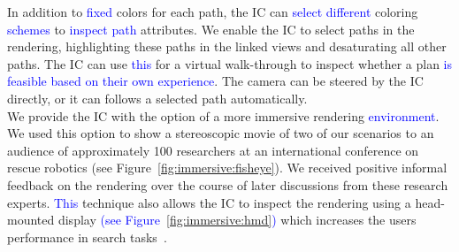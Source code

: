 \documentclass{egpubl}
\newcommand{\diff}[1]{\textcolor{blue}{#1}}
\begin{document}
%
 In addition to \diff{fixed} colors for each path, the IC can \diff{select different} coloring \diff{schemes} to \diff{inspect path} attributes. We enable the IC to select paths in the rendering, highlighting these paths in the linked views and desaturating all other paths. The IC can use \diff{this} for a virtual walk-through to inspect whether a plan \diff{is feasible based on their own experience}. The camera can be steered by the IC directly, or it can follows a selected path automatically.\\
%
 We provide the IC with the option of a more immersive rendering \diff{environment}. We used this option to show a stereoscopic movie of two of our scenarios to an audience of approximately 100 researchers at an international conference on rescue robotics (see Figure~\ref{fig:immersive:fisheye}). We received positive informal feedback on the rendering over the course of later discussions from these research experts. \diff{This} technique also allows the IC to inspect the rendering using a head-mounted display \diff{(see Figure~\ref{fig:immersive:hmd})} which increases the users performance in search tasks~\cite{pausch1997quantifying}. 
\end{document}
